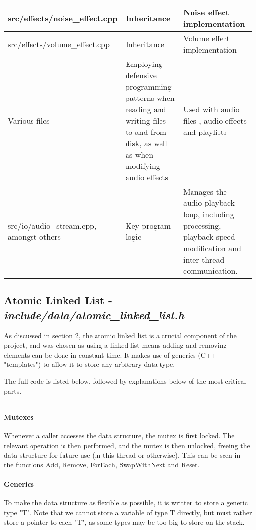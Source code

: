 {\begin{table}[h!]
\begin{center}
\begin{tabularx}{1.0 \textwidth} {
					| >{\raggedright\arraybackslash}X 
					| >{\raggedright\arraybackslash}X
					| >{\raggedright\arraybackslash}X 
					|
				}
				\hline
				src/effects/noise\_effect.cpp & Inheritance & Noise effect implementation \\
				
				\hline
				src/effects/volume\_effect.cpp & Inheritance & Volume effect implementation \\
				
				\hline
				Various files & Employing defensive programming patterns when reading and writing files to and from disk, as well as when modifying audio effects & Used with audio files , audio effects and playlists \\
				
				\hline
				src/io/audio\_stream.cpp, amongst others & Key program logic & Manages the audio playback loop, including processing, playback-speed modification and inter-thread communication. \\
				
				\hline
			\end{tabularx}
		\end{center}
	\end{table}
}

\pagebreak
\subsection{Atomic Linked List - \textit{include/data/atomic\_linked\_list.h}}
As discussed in section 2, the atomic linked list is a crucial component of the project, and was chosen as using a linked list means adding and removing elements can be done in constant time.  It makes use of generics (C++ "templates") to allow it to store any arbitrary data type. 

The full code is listed below, followed by explanations below of the most critical parts.

\inputminted[linenos]{c++}{../include/data/atomic_linked_list.h}

\paragraph{Mutexes} Whenever a caller accesses the data structure, the mutex is first locked. The relevant operation is then performed, and the mutex is then unlocked, freeing the data structure for future use (in this thread or otherwise). This can be seen in the functions Add, Remove, ForEach, SwapWithNext and Reset.

\paragraph{Generics} To make the data structure as flexible as possible, it is written to store a generic type "T". Note that we cannot store a variable of type T directly, but must rather store a pointer to each "T", as some types may be too big to store on the stack.

